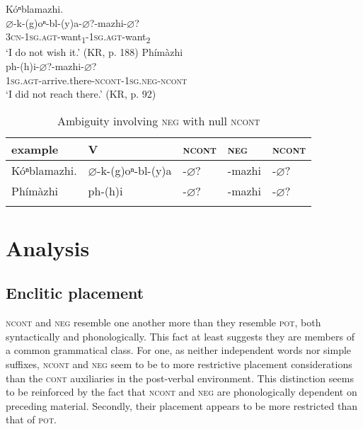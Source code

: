 \documentclass[output=paper]{LSP/langsci}
\begin{document}
\ea \label{ambiguity}
  \ea \label{ambiguity1} 
  Kóⁿblamazhi.\\
  \gll $\varnothing$-k-(g)oⁿ-bl-(y)a-$\varnothing$?-mazhi-$\varnothing$? \\
  \textsc{3cn-1sg.agt}-want\textsubscript{1}-\textsc{1sg.agt}-want\textsubscript{2} \\ 
  \glt `I do not wish it.' (KR, p. 188)  
  \ex \label{ambiguity2} 
  Phímàzhi\\
  \gll ph-(h)i-$\varnothing$?-mazhi-$\varnothing$?  \\
  \textsc{1sg.agt}-arrive.there-\textsc{ncont}-\textsc{1sg.neg}-\textsc{ncont} \\
  \glt `I did not reach there.' (KR, p. 92) 
  \z 
\z 

\begin{table}
\caption{Ambiguity involving \textsc{neg} with null \textsc{ncont}} \label{tableambiguity}
\begin{tabular}[h!]{ l l l l l }
\lsptoprule
example & V & \textsc{ncont}	& \textsc{neg} & \textsc{ncont} \\
\midrule
Kóⁿblamazhi. & $\varnothing$-k-(g)oⁿ-bl-(y)a & -$\varnothing$? & -mazhi & -$\varnothing$? \\
Phímàzhi & ph-(h)i & -$\varnothing$? &  -mazhi & -$\varnothing$?  \\
\lspbottomrule
\end{tabular}
\end{table}

\section{Analysis}
\subsection{Enclitic placement}
\textsc{ncont} and \textsc{neg} resemble one another more than they resemble \textsc{pot}, both syntactically and phonologically. This fact at least suggests they are members of a common grammatical class. For one, as neither independent words nor simple suffixes, \textsc{ncont} and \textsc{neg} seem to be  to more restrictive placement considerations than the \textsc{cont} auxiliaries in the post-verbal environment. This distinction seems to be reinforced by the fact that \textsc{ncont} and \textsc{neg} are phonologically dependent on preceding material. Secondly, their placement appears to be more restricted than that of \textsc{pot}.
\end{document}
